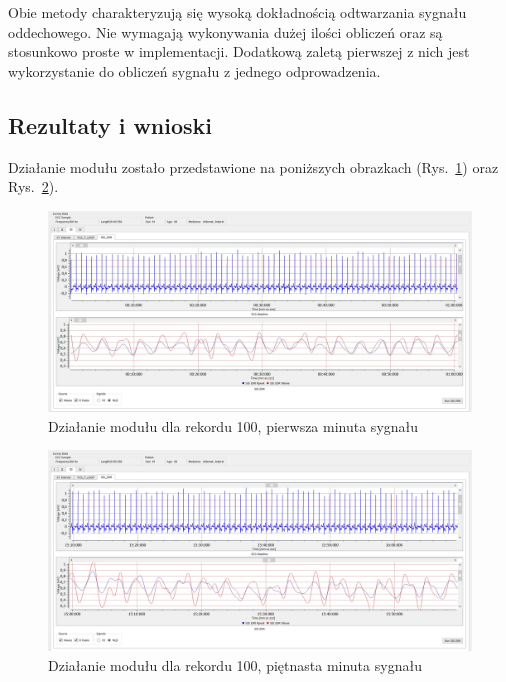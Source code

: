 		Obie metody charakteryzują się wysoką dokładnością odtwarzania sygnału oddechowego. Nie wymagają wykonywania dużej ilości obliczeń oraz są stosunkowo proste w implementacji. Dodatkową zaletą pierwszej z nich jest wykorzystanie do obliczeń sygnału z jednego odprowadzenia.
	   
\subsection{Rezultaty i wnioski}
 
		Działanie modułu zostało przedstawione na poniższych obrazkach (Rys.~\ref{fig:aplikacja_1}) oraz Rys.~\ref{fig:aplikacja_2}).
	   
\begin{figure}[h]
\centering
\includegraphics[width=12cm]{SIG_EDR/img/aplikacja_1_1.jpg}
\caption{Działanie modułu dla rekordu 100, pierwsza minuta sygnału}
\label{fig:aplikacja_1}
\end{figure}
 
\begin{figure}[h]
\centering
\includegraphics[width=12cm]{SIG_EDR/img/aplikacja_2_2.jpg}
\caption{Działanie modułu dla rekordu 100, piętnasta minuta sygnału}
\label{fig:aplikacja_2}
\end{figure}
 
